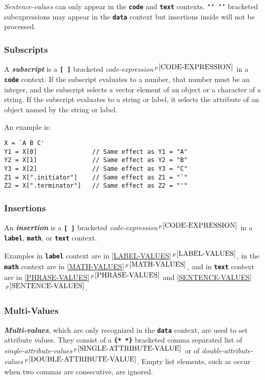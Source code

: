 \documentclass[12pt]{article}
\newcommand{\TT}[1]{{\tt \bfseries #1}}
\newcommand{\key}[1]{{\bf \em #1}\index{#1}}
\newcommand{\ikey}[2]{{\bf \em #1}\index{#2}}
\newcommand{\itemref}[1]{\ref{#1}$\,^{p\,\pageref{#1}}$}
\newcommand{\pagnote}[1]{$\,^{p\,\pageref{#1}}$}
\newenvironment{indpar}[1][0.3in]%
	{\begin{list}{}%
		     {\setlength{\itemsep}{0in}%
		      \setlength{\topsep}{0in}%
		      \setlength{\parsep}{1ex}%
		      \setlength{\labelwidth}{#1}%
		      \setlength{\leftmargin}{#1}%
		      \addtolength{\leftmargin}{\labelsep}}%
	 \item}%
	{\end{list}}
\begin{document}
{\em Sentence-values} can only appear in the \TT{code} and \TT{text}
contexts.  \TT{`{}`~'{}'} bracketed subexpressions may appear in the
\TT{data} context but insertions inside will not be processed.

\subsubsection{Subscripts}
\label{SUBSCRIPTS}

A \key{subscript} is a \TT{[~]} bracketed
{\em code-expression}\pagnote{CODE-EXPRESSION} in a
\TT{code} context.  If the subscript evaluates to a number,
that number must be an integer, and the subscript
selects a vector element of an object or a character of a string.
If the subscript evaluates to a string or label, it selects the
attribute of an object named by the string or label.

An example is:
\begin{indpar}\begin{verbatim}
X = `A B C'
Y1 = X[0]               // Same effect as Y1 = "A"
Y2 = X[1]               // Same effect as Y2 = "B"
Y3 = X[2]               // Same effect as Y3 = "C"
Z1 = X[".initiator"]    // Same effect as Z1 = "`"
Z2 = X[".terminator"]   // Same effect as Z2 = "'"
\end{verbatim}\end{indpar}

\subsubsection{Insertions}
\label{INSERTIONS}

An \key{insertion} is a \TT{[~]} bracketed
{\em code-expression}\pagnote{CODE-EXPRESSION} in a
\TT{label}, \TT{math}, or \TT{text} context.

Examples in \TT{label} context are in \itemref{LABEL-VALUES},
in the \TT{math} context are in \itemref{MATH-VALUES},
and in \TT{text} context are in
\itemref{PHRASE-VALUES} and \itemref{SENTENCE-VALUES}.

\subsubsection{Multi-Values}
\label{MULTI-VALUES}

\ikey{Multi-values}{multi-value}, which are only recognized in
the \TT{data} context, are used to set attribute values.
They consist of a \TT{\{*~*\}} bracketed comma separated list
of {\em single-attribute-values}\pagnote{SINGLE-ATTRIBUTE-VALUE} or
of {\em double-attribute-values}\pagnote{DOUBLE-ATTRIBUTE-VALUE}.
Empty list elements, such as occur when two commas are consecutive,
are ignored.
\end{document}
